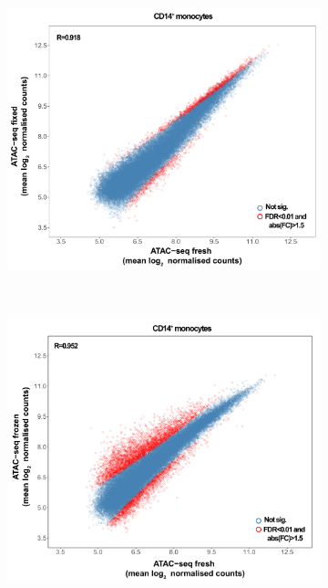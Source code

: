 \begin{figure}[H]
\centering
\begin{subfigure}[b]{0.45\textwidth}
\centering 
\includegraphics[width=\textwidth]{./Results1/pdfs/Core_ATAC_CD14_fresh_fixed_correlation_counts_small}
\caption{}
\end{subfigure}
~
\begin{subfigure}[b]{0.45\textwidth}
\centering 
\includegraphics[width=\textwidth]{./Results1/pdfs/Core_ATAC_CD14_fresh_frozen_correlation_counts_small}
\caption{}
\end{subfigure}

\end{figure}
